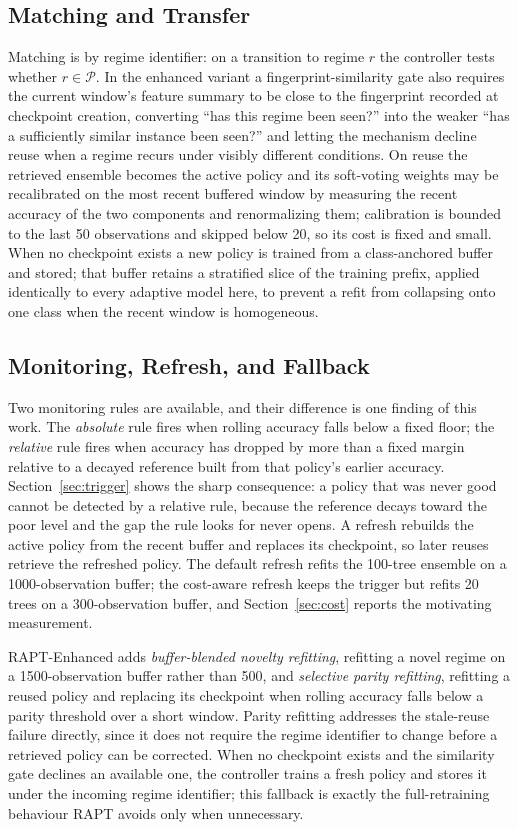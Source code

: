 \documentclass[conference]{IEEEtran}
\begin{document}
\subsection{Matching and Transfer}
Matching is by regime identifier: on a transition to regime $r$ the controller tests
whether $r \in \mathcal{P}$. In the enhanced variant a fingerprint-similarity gate
also requires the current window's feature summary to be close to the fingerprint
recorded at checkpoint creation, converting ``has this regime been seen?'' into the
weaker ``has a sufficiently similar instance been seen?'' and letting the mechanism
decline reuse when a regime recurs under visibly different conditions. On reuse the
retrieved ensemble becomes the active policy and its soft-voting weights may be
recalibrated on the most recent buffered window by measuring the recent accuracy of
the two components and renormalizing them; calibration is bounded to the last 50
observations and skipped below 20, so its cost is fixed and small. When no checkpoint
exists a new policy is trained from a class-anchored buffer and stored; that buffer
retains a stratified slice of the training prefix, applied identically to every
adaptive model here, to prevent a refit from collapsing onto one class when the recent
window is homogeneous.

\subsection{Monitoring, Refresh, and Fallback}
Two monitoring rules are available, and their difference is one finding of this work.
The \emph{absolute} rule fires when rolling accuracy falls below a fixed floor; the
\emph{relative} rule fires when accuracy has dropped by more than a fixed margin
relative to a decayed reference built from that policy's earlier accuracy.
Section~\ref{sec:trigger} shows the sharp consequence: a policy that was never good
cannot be detected by a relative rule, because the reference decays toward the poor
level and the gap the rule looks for never opens. A refresh rebuilds the active
policy from the recent buffer and replaces its checkpoint, so later reuses retrieve
the refreshed policy. The default refresh refits the 100-tree ensemble on a
1000-observation buffer; the cost-aware refresh keeps the trigger but refits 20 trees
on a 300-observation buffer, and Section~\ref{sec:cost} reports the motivating
measurement.

RAPT-Enhanced adds \emph{buffer-blended novelty refitting}, refitting a novel regime
on a 1500-observation buffer rather than 500, and \emph{selective parity refitting},
refitting a reused policy and replacing its checkpoint when rolling accuracy falls
below a parity threshold over a short window. Parity refitting addresses the
stale-reuse failure directly, since it does not require the regime identifier to
change before a retrieved policy can be corrected. When no checkpoint exists and the
similarity gate declines an available one, the controller trains a fresh policy and
stores it under the incoming regime identifier; this fallback is exactly the
full-retraining behaviour RAPT avoids only when unnecessary.
\end{document}
